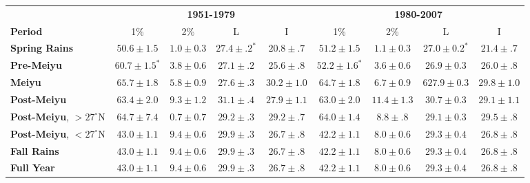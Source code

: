 \documentclass[draft,grl]{agutexSI}
\begin{document}
\begin{article}
\begin{table}
\centering
\begin{tabular}{ l c c c c | c c c c}
	& \multicolumn{4}{c}{\textbf{1951-1979}} & \multicolumn{4}{c}{\textbf{1980-2007}} \\
	\textbf{Period} & 1\% & 2\% & L & I & 1\% & 2\% & L & I \\
	\hline	
	\textbf{Spring Rains} & $50.6 \pm 1.5$ & $1.0 \pm 0.3$ & $\boldsymbol{27.4 \pm .2^*}$ & $20.8 \pm .7$ & $51.2 \pm 1.5$ & $1.1 \pm 0.3$ & $\boldsymbol{27.0 \pm 0.2^*}$ & $21.4 \pm .7$ \\
	\textbf{Pre-Meiyu} & $\boldsymbol{60.7 \pm 1.5^*}$ & $3.8 \pm 0.6$ & $27.1 \pm .2$ & $25.6 \pm .8$ & $\boldsymbol{52.2 \pm 1.6^*}$ & $3.6 \pm 0.6$ & $26.9 \pm 0.3$ & $26.0 \pm .8$\\
	\textbf{Meiyu} &	$65.7 \pm 1.8$ & $5.8 \pm 0.9$ & $27.6 \pm .3$ & $30.2 \pm 1.0$ & $64.7 \pm 1.8$  & $6.7 \pm 0.9$ & 6$ 27.9 \pm 0.3$ & $29.8 \pm 1.0$ \\
	\textbf{Post-Meiyu} & $63.4 \pm 2.0$ & $9.3 \pm 1.2$ & $31.1 \pm .4$ & $27.9 \pm 1.1$ & $63.0 \pm 2.0$ & $11.4 \pm 1.3$ & $30.7 \pm 0.3$ & $29.1 \pm 1.1$ \\
	\textbf{Post-Meiyu}, $>27^\circ$N & $64.7 \pm 7.4$ & $0.7 \pm 0.7$ & $29.2 \pm .3$ & $29.2 \pm .7$ & $64.0 \pm 1.4$ & $8.8 \pm .8$ & $29.1 \pm 0.3$ & $29.5 \pm .8$\\
	\textbf{Post-Meiyu}, $<27^\circ$N & $43.0 \pm 1.1 $ & $9.4 \pm 0.6$ & $\boldsymbol{29.9 \pm .3}$ & $26.7 \pm .8$ & $42.2 \pm 1.1$ & $8.0 \pm 0.6$ & $\boldsymbol{29.3 \pm 0.4}$ &  $26.8 \pm .8$ \\
	\textbf{Fall Rains} & $43.0 \pm 1.1 $ & $9.4 \pm 0.6$ & $\boldsymbol{29.9 \pm .3}$ & $26.7 \pm .8$ & $42.2 \pm 1.1$ & $8.0 \pm 0.6$ & $\boldsymbol{29.3 \pm 0.4}$ &  $26.8 \pm .8$ \\
	\textbf{Full Year} & $43.0 \pm 1.1 $ & $9.4 \pm 0.6$ & $\boldsymbol{29.9 \pm .3}$ & $26.7 \pm .8$ & $42.2 \pm 1.1$ & $8.0 \pm 0.6$ & $\boldsymbol{29.3 \pm 0.4}$ &  $26.8 \pm .8$ \\

\end{tabular}%
\end{table}



\end{article}
\end{document}
